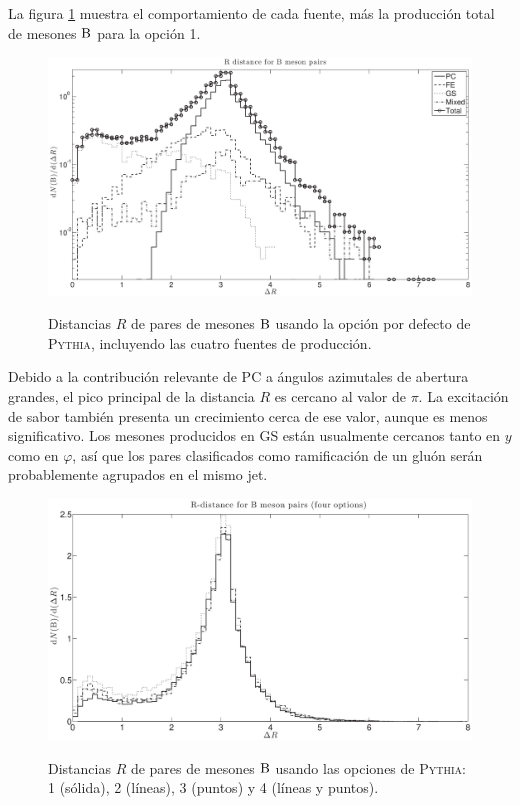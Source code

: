 \documentclass[a4paper,12pt]{article}
\begin{document}
La figura \ref{fig:BBROp1} muestra el comportamiento de cada fuente, más la producción total de mesones $\B$ para la opción 1.
\begin{figure}[!h]
\centering
\caption[Distancia $R$ de pares de mesones $\B$. Opción por feceto de \textsc{Pythia}.]{ Distancias $R$ de pares de mesones $\B$ usando la opción por defecto de \textsc{Pythia}, incluyendo las cuatro fuentes de producción.}
\includegraphics[width=15cm]{BBROp1}
\label{fig:BBROp1}
\end{figure}
Debido a la contribución relevante de PC a ángulos azimutales de abertura grandes, el pico principal de la distancia $R$ es cercano al valor de $\pi$. La excitación de sabor también presenta un crecimiento cerca de ese valor, aunque es menos significativo. Los mesones producidos en GS están usualmente cercanos tanto en $y$ como en $\varphi$, así que los pares clasificados como ramificación de un gluón serán probablemente agrupados en el mismo jet.
\begin{figure}[!h]
\centering
\caption[Distancia $R$ de pares de mesones $\B$. Cuatro opciones de \textsc{Pythia}.]{Distancias $R$ de pares de mesones $\B$ usando las opciones  de \textsc{Pythia}:  1 (sólida), 2 (líneas), 3 (puntos) y 4 (líneas y puntos).}
\includegraphics[width=15cm]{BBR4Op}
\label{fig:BBR4Op}
\end{figure}
\end{document}
